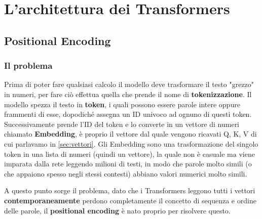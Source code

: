 \documentclass{article}
\begin{document}
\section{L'architettura dei Transformers}
\subsection{Positional Encoding}
\subsubsection{Il problema}
Prima di poter fare qualsiasi calcolo il modello deve trasformare il testo "grezzo" in numeri, per fare ciò effettua quella che prende il nome di \textbf{tokenizzazione}. Il modello spezza il testo in \textbf{token}, i quali possono essere parole intere oppure frammenti di esse, dopodiché assegna un ID univoco ad ognuno di questi token. Successivamente prende l'ID del token e lo converte in un vettore di numeri chiamato \textbf{Embedding}, è proprio il vettore dal quale vengono ricavati Q, K, V di cui parlavamo in \ref{sec:vettori}. Gli Embedding sono una trasformazione del singolo token in una lista di numeri (quindi un vettore), la quale non è casuale ma viene imparata dalla rete leggendo milioni di testi, in modo che parole molto simili (o che appaiono spesso negli stessi contesti) abbiano valori numerici molto simili.

A questo punto sorge il problema, dato che i Transformers leggono tutti i vettori \textbf{contemporaneamente} perdono completamente il concetto di sequenza e ordine delle parole, il \textbf{positional encoding} è nato proprio per risolvere questo.
\end{document}
